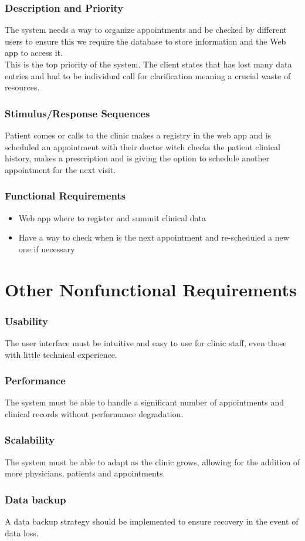 \documentclass{scrreprt}
\begin{document}
	 
	
	\subsection{Description and Priority}
	The system needs a way to organize appointments and be checked by different users to ensure this we require the database to store information and the Web app to access it.\\
	This is the top priority of the system. The client states that has lost many data entries and had to be individual call for clarification meaning a crucial waste of resources. 
	
	\subsection{Stimulus/Response Sequences}
	 Patient comes or calls to the clinic makes a registry in the web app and is scheduled an appointment with their doctor witch checks the patient clinical history, makes a prescription and is giving the option to schedule another appointment for the next visit.
	
	\subsection{Functional Requirements}
	
	 \begin{itemize}
	 	\item Web app where to register and summit clinical data
	 	\item Have a way to check when is the next appointment and re-scheduled a new one if necessary 
	 \end{itemize}
	
	
	\chapter{Other Nonfunctional Requirements}
	\subsection{Usability}
	The user interface must be intuitive and easy to use for clinic staff, even those with little technical experience.
	\subsection{Performance}
	The system must be able to handle a significant number of appointments and clinical records without performance degradation.
	\subsection{Scalability}
	The system must be able to adapt as the clinic grows, allowing for the addition of more physicians, patients and appointments.
	\subsection{Data backup}
	A data backup strategy should be implemented to ensure recovery in the event of data loss.
	
	
	
	
\end{document}
